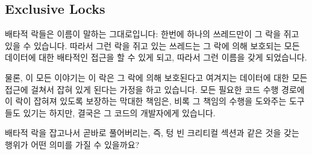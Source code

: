 \subsection{Exclusive Locks}
\label{sec:locking:Exclusive Locks}

배타적 락들은 이름이 말하는 그대로입니다: 한번에 하나의 쓰레드만이 그 락을 쥐고
있을 수 있습니다.
따라서 그런 락을 쥐고 있는 쓰레드는 그 락에 의해 보호되는 모든 데이터에 대한
배타적인 접근을 할 수 있게 되고, 따라서 그런 이름을 갖게 되었습니다.

물론, 이 모든 이야기는 이 락은 그 락에 의해 보호된다고 여겨지는 데이터에 대한
모든 접근에 걸쳐서 잡혀 있게 된다는 가정을 하고 있습니다.
모든 필요한 코드 수행 경로에 이 락이 잡혀져 있도록 보장하는 막대한 책임은, 비록
그 책임의 수행을 도와주는 도구들도 있기는 하지만, 결국은 그 코드의 개발자에게
있습니다.

\QuickQuiz{}
	배타적 락을 잡고나서 곧바로 풀어버리는, 즉, 텅 빈 크리티컬 섹션과 같은
	것을 갖는 행위가 어떤 의미를 가질 수 있을까요?
	\iffalse

